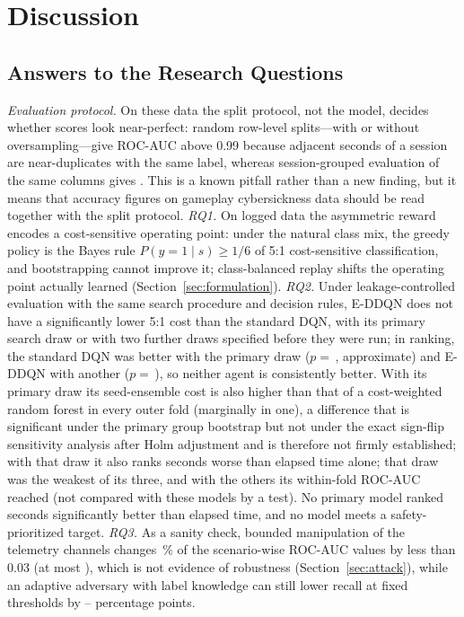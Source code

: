 \section{Discussion}
\label{sec:discussion}

\subsection{Answers to the Research Questions}
\emph{Evaluation protocol.} On these data the split protocol, not the model, decides whether scores look near-perfect: random row-level splits---with or without oversampling---give ROC-AUC above 0.99 because adjacent seconds of a session are near-duplicates with the same label, whereas session-grouped evaluation of the same columns gives \LeakGrpRocAuc. This is a known pitfall rather than a new finding, but it means that accuracy figures on gameplay cybersickness data should be read together with the split protocol.
\emph{RQ1.} On logged data the asymmetric reward encodes a cost-sensitive operating point: under the natural class mix, the greedy policy is the Bayes rule $P(y=1\mid s)\ge1/6$ of 5:1 cost-sensitive classification, and bootstrapping cannot improve it; class-balanced replay shifts the operating point actually learned (Section~\ref{sec:formulation}).
\emph{RQ2.} Under leakage-controlled evaluation with the same search procedure and decision rules, E-DDQN does not have a significantly lower 5:1 cost than the standard DQN, with its primary search draw or with two further draws specified before they were run; in ranking, the standard DQN was better with the primary draw ($p=$\,\SDPairOneAucP, approximate) and E-DDQN with another ($p=$\,\SDPairTwoAucP), so neither agent is consistently better. With its primary draw its seed-ensemble cost is also higher than that of a cost-weighted random forest in every outer fold (marginally in one), a difference that is significant under the primary group bootstrap but not under the exact sign-flip sensitivity analysis after Holm adjustment and is therefore not firmly established; with that draw it also ranks seconds worse than elapsed time alone; that draw was the weakest of its three, and with the others its within-fold ROC-AUC reached \SDEDDQNWfMax{} (not compared with these models by a test). No primary model ranked seconds significantly better than elapsed time, and no model meets a safety-prioritized target.
\emph{RQ3.} As a sanity check, bounded manipulation of the telemetry channels changes \AttAucFracSmall\,\% of the scenario-wise ROC-AUC values by less than 0.03 (at most \AttAucMaxAbsChange), which is not evidence of robustness (Section~\ref{sec:attack}), while an adaptive adversary with label knowledge can still lower recall at fixed thresholds by \AttEvasionDropMin--\AttEvasionDropMax{} percentage points.


